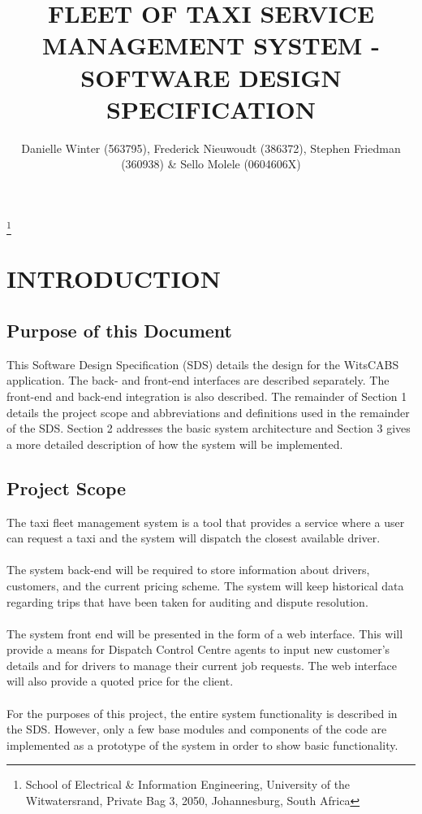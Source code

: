 \documentclass[10pt, onecolumn]{witseiepaper}
\begin{document}
\title{FLEET OF TAXI SERVICE MANAGEMENT SYSTEM - SOFTWARE DESIGN SPECIFICATION}

\author{Danielle Winter (563795), Frederick Nieuwoudt (386372), Stephen Friedman (360938) \& Sello Molele (0604606X)}
\thanks{School of Electrical \& Information Engineering, University of the
Witwatersrand, Private Bag 3, 2050, Johannesburg, South Africa}


%

\maketitle
\thispagestyle{empty}\pagestyle{empty}


%
\section{INTRODUCTION}
\subsection{Purpose of this Document}
This Software Design Specification (SDS) details the design for the WitsCABS application. The back- and front-end interfaces are described separately. The front-end and back-end integration is also described. The remainder of Section 1 details the project scope and abbreviations and definitions used in the remainder of the SDS. Section 2 addresses the basic system architecture and Section 3 gives a more detailed description of how the system will be implemented. 
\subsection{Project Scope}
The taxi fleet management system is a tool that provides a service where a user can request a taxi and the system will dispatch the closest available driver.\\\\
The system back-end will be required to store information about drivers, customers, and the current pricing scheme. The system will keep historical data regarding trips that have been taken for auditing and dispute resolution.\\\\
The system front end will be presented in the form of a web interface. This will provide a means for Dispatch Control Centre agents to input new customer's details and for drivers to manage their current job requests. The web interface will also provide a quoted price for the client.\\\\
For the purposes of this project, the entire system functionality is described in the SDS. However, only a few base modules and components of the code are implemented as a prototype of the system in order to show basic functionality.
\end{document}

